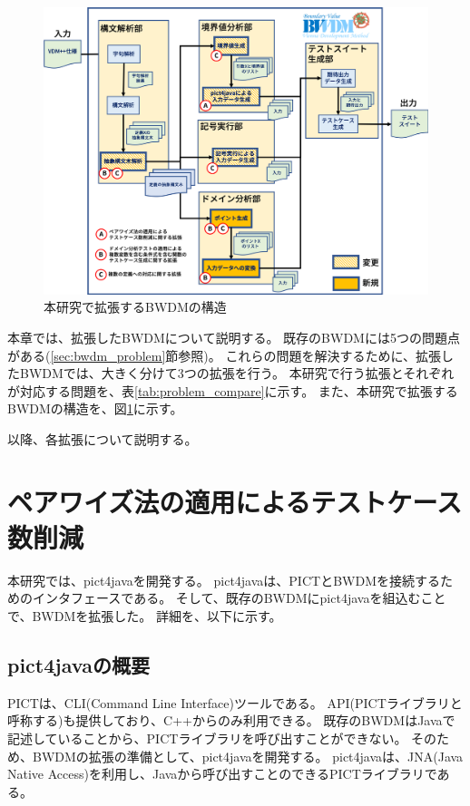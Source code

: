 \documentclass[uplatex, report, a4j, 10pt]{jsbook}
\newcommand{\tool}{BWDM}
\begin{document}
\begin{figure}[tp]
  \centering
  \includegraphics[keepaspectratio, width=160mm]{figs/extended_bwdm_structure}
  \caption{本研究で拡張するBWDMの構造}
  \label{fig:extendedBwdmStructure}
\end{figure}

本章では、拡張した\tool{}について説明する。
既存のBWDMには5つの問題点がある(\ref{sec:bwdm_problem}節参照)。
これらの問題を解決するために、拡張した\tool{}では、大きく分けて3つの拡張を行う。
本研究で行う拡張とそれぞれが対応する問題を、表\ref{tab:problem_compare}に示す。
また、本研究で拡張するBWDMの構造を、図\ref{fig:extendedBwdmStructure}に示す。

以降、各拡張について説明する。

\section{ペアワイズ法の適用によるテストケース数削減}\label{sec:extendPairwise}
本研究では、pict4javaを開発する。
pict4javaは、PICTとBWDMを接続するためのインタフェースである。
そして、既存のBWDMにpict4javaを組込むことで、BWDMを拡張した。
詳細を、以下に示す。

\subsection{pict4javaの概要}\label{sec:create_pict4java}
PICTは、CLI(Command Line Interface)ツールである。
API(PICTライブラリと呼称する)も提供しており、C++からのみ利用できる。
既存のBWDMはJavaで記述していることから、PICTライブラリを呼び出すことができない。
そのため、BWDMの拡張の準備として、pict4javaを開発する。
pict4javaは、JNA(Java Native Access)\cite{jna}を利用し、Javaから呼び出すことのできるPICTライブラリである。
\end{document}
